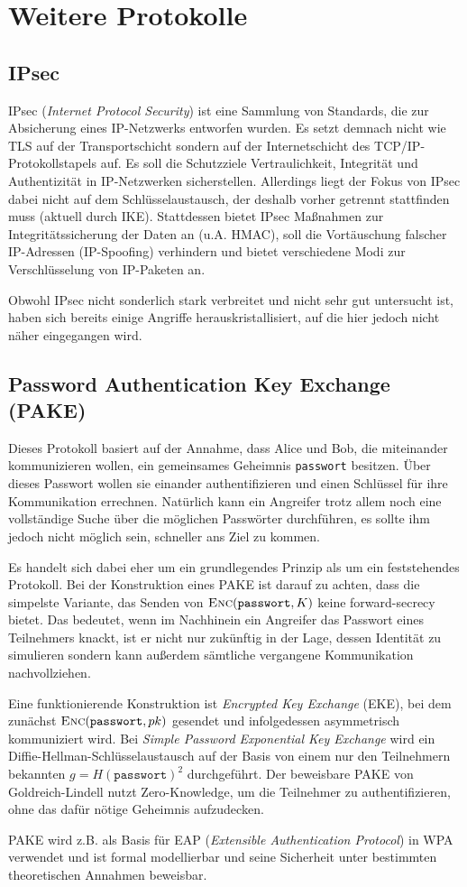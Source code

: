 \section{Weitere Protokolle}

\subsection{IPsec}
IPsec (\emph{Internet Protocol Security}) ist eine Sammlung von Standards, die zur Absicherung eines IP-Netzwerks entworfen wurden. Es setzt demnach nicht wie
TLS auf der Transportschicht sondern auf der Internetschicht des TCP/IP-Protokollstapels auf. Es soll die Schutzziele Vertraulichkeit, Integrität und
Authentizität in IP-Netzwerken sicherstellen. Allerdings liegt der Fokus von IPsec dabei nicht auf dem Schlüsselaustausch, der deshalb vorher getrennt
stattfinden muss (aktuell durch IKE). Stattdessen bietet IPsec Maßnahmen zur Integritätssicherung der Daten an (u.A. HMAC), soll die Vortäuschung falscher
IP-Adressen (IP-Spoofing) verhindern und bietet verschiedene Modi zur Verschlüsselung von IP-Paketen an.

Obwohl IPsec nicht sonderlich stark verbreitet und nicht sehr gut untersucht ist, haben sich bereits einige Angriffe herauskristallisiert, auf die hier jedoch
nicht näher eingegangen wird.


\subsection{Password Authentication Key Exchange (PAKE)}
Dieses Protokoll basiert auf der Annahme, dass Alice und Bob, die miteinander kommunizieren wollen, ein gemeinsames Geheimnis \texttt{passwort} besitzen. Über
dieses Passwort wollen sie einander authentifizieren und einen Schlüssel für ihre Kommunikation errechnen. Natürlich kann ein Angreifer trotz allem noch eine
vollständige Suche über die möglichen Passwörter durchführen, es sollte ihm jedoch nicht möglich sein, schneller ans Ziel zu kommen.

Es handelt sich dabei eher um ein grundlegendes Prinzip als um ein feststehendes Protokoll. Bei der Konstruktion eines PAKE ist darauf zu achten, dass die
simpelste Variante, das Senden von $\textsc{Enc}(\mathtt{passwort}, K)$ keine forward-secrecy bietet. Das bedeutet, wenn im Nachhinein ein Angreifer das Passwort
eines Teilnehmers knackt, ist er nicht nur zukünftig in der Lage, dessen Identität zu simulieren sondern kann außerdem sämtliche vergangene Kommunikation
nachvollziehen.

Eine funktionierende Konstruktion ist \emph{Encrypted Key Exchange} (EKE), bei dem zunächst $\textsc{Enc}(\mathtt{passwort},pk)$ gesendet und infolgedessen
asymmetrisch kommuniziert wird. Bei \emph{Simple Password Exponential Key Exchange} wird ein Diffie-Hellman-Schlüsselaustausch auf der Basis von einem nur den
Teilnehmern bekannten $g = H(\mathtt{passwort})^2$ durchgeführt. Der beweisbare PAKE von Goldreich-Lindell nutzt Zero-Knowledge, um die Teilnehmer zu
authentifizieren, ohne das dafür nötige Geheimnis aufzudecken.

PAKE wird z.B. als Basis für EAP (\emph{Extensible Authentication Protocol}) in WPA verwendet und ist formal modellierbar und seine Sicherheit unter bestimmten
theoretischen Annahmen beweisbar.
